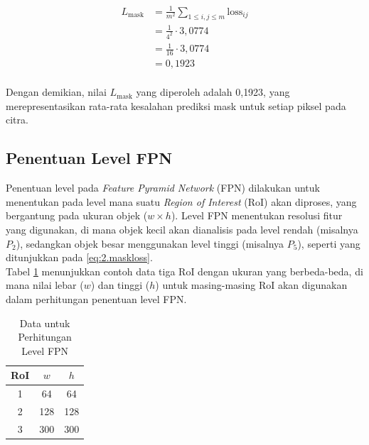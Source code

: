 \begin{align*}
    L_{\text{mask}} &= \frac{1}{m^2}\sum_{1 \leq i,j \leq m}{\text{loss}_{ij}} \\[0.5em]
     &= \frac{1}{4^2} \cdot 3{,}0774 \\[0.5em]
     &= \frac{1}{16} \cdot 3{,}0774 \\[0.5em]
     &= 0{,}1923 \\[0.5em]
\end{align*}

Dengan demikian, nilai $L_{\text{mask}}$ yang diperoleh adalah 0{,}1923, yang merepresentasikan rata-rata kesalahan prediksi mask untuk setiap piksel pada citra.

\subsection{Penentuan Level FPN}
Penentuan level pada \textit{Feature Pyramid Network} (FPN) dilakukan untuk menentukan pada level mana suatu \textit{Region of Interest} (RoI) akan diproses, yang bergantung pada ukuran objek ($w \times h$). Level FPN menentukan resolusi fitur yang digunakan, di mana objek kecil akan dianalisis pada level rendah (misalnya $P_2$), sedangkan objek besar menggunakan level tinggi (misalnya $P_5$), seperti yang ditunjukkan pada \ref{eq:2.maskloss}.  \\


Tabel \ref{table:3.data-fpn-level} menunjukkan contoh data tiga RoI dengan ukuran yang berbeda-beda, di mana nilai lebar ($w$) dan tinggi ($h$) untuk masing-masing RoI akan digunakan dalam perhitungan penentuan level FPN.

\begin{table}[H]
\centering
\caption{Data untuk Perhitungan Level FPN}
\renewcommand{\arraystretch}{1.3}
\label{table:3.data-fpn-level}
\begin{tabular}{|c|c|c|}
\hline
\textbf{RoI} & \textbf{$w$} & \textbf{$h$} \\ 
\hline
1 & 64 & 64 \\ 
\hline
2 & 128 & 128 \\ 
\hline
3 & 300 & 300 \\
\hline
\end{tabular}
\end{table}

